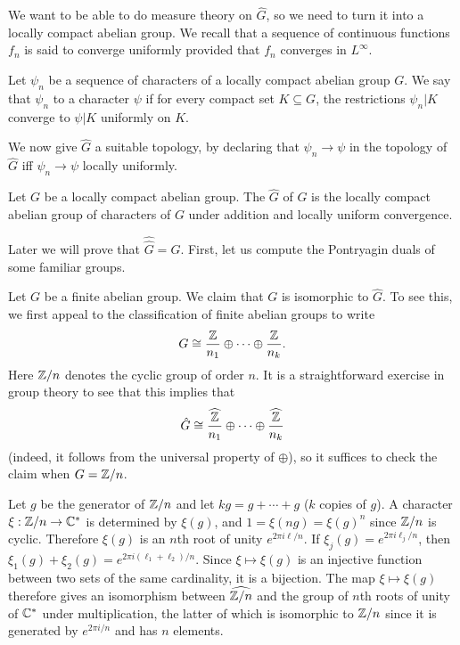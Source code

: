 We want to be able to do measure theory on $\hat{G}$, so we need to turn it into a locally compact abelian group.
We recall that a sequence of continuous functions $f_{n}$ is said to converge uniformly provided that $f_{n}$ converges in $L^{\infty}$.
\begin{definition}
Let $\psi_{n}$ be a sequence of characters of a locally compact abelian group $G$.
We say that $\psi_{n}$  to a character $\psi$ if for every compact set $K \subseteq G$, the restrictions $\psi_{n}|K$ converge to $\psi|K$ uniformly on $K$.
\end{definition}
We now give $\hat{G}$ a suitable topology, by declaring that $\psi_{n} \to \psi$ in the topology of $\hat{G}$ iff $\psi_{n} \to \psi$ locally uniformly.

\begin{definition}
Let $G$ be a locally compact abelian group.
The  $\hat{G}$ of $G$ is the locally compact abelian group of characters of $G$ under addition and locally uniform convergence.
\end{definition}

Later we will prove that $\widehat{\hat{G}} = G$. First, let us compute the Pontryagin duals of some familiar groups.

\begin{example}
Let $G$ be a finite abelian group. We claim that $G$ is isomorphic to $\hat{G}$. To see this, we first appeal to the classification of finite abelian groups to write
\[G \cong \frac{\mathbb{Z}}{n_{1}} \oplus \cdots \oplus \frac{\mathbb{Z}}{n_{k}}.\]
Here $\mathbb{Z}/n$ denotes the cyclic group of order $n$.
It is a straightforward exercise in group theory to see that this implies that
\[\hat{G} \cong \widehat{\frac{\mathbb{Z}}{n_{1}}} \oplus \cdots \oplus \widehat{\frac{\mathbb{Z}}{n_{k}}}\]
(indeed, it follows from the universal property of $\oplus$), so it suffices to check the claim when $G = \mathbb{Z}/n$.

Let $g$ be the generator of $\mathbb{Z}/n$ and let $kg = g + \cdots + g$ ($k$ copies of $g$).
A character $\xi: \mathbb{Z}/n \to \mathbb{C}^{*}$ is determined by $\xi(g)$, and $1 = \xi(ng) = \xi{(g)}^{n}$ since $\mathbb{Z}/n$ is cyclic.
Therefore $\xi(g)$ is an $n$th root of unity $e^{2\pi i\ell/n}$.
If $\xi_{j}(g) = e^{2\pi i \ell_{j}/n}$, then $\xi_{1}(g) + \xi_{2}(g) = e^{2\pi i(\ell_{1} + \ell_{2})/n}$.
Since $\xi \mapsto \xi(g)$ is an injective function between two sets of the same cardinality, it is a bijection.
The map $\xi \mapsto \xi(g)$ therefore gives an isomorphism between $\widehat{\mathbb{Z}/n}$ and the group of $n$th roots of unity of $\mathbb{C}^{*}$ under multiplication, the latter of which is isomorphic to $\mathbb{Z}/n$ since it is generated by $e^{2\pi i/n}$ and has $n$ elements.
\end{example}

